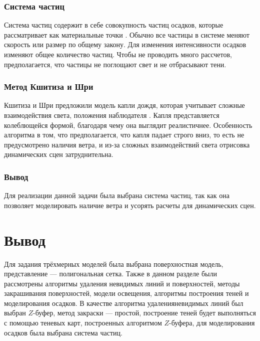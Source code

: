 \subsubsection{Система частиц}

Система частиц содержит в себе совокупность частиц осадков, которые рассматривает как материальные точки \cite{part_system}. Обычно все частицы в системе меняют скорость или размер по общему закону. Для изменения интенсивности осадков изменяют общее количество частиц. Чтобы не проводить много рассчетов, предполагается, что частицы не поглощают свет и не отбрасывают тени.

\subsubsection{Метод Кшитиза и Шри}
Кшитиза и Шри предложили модель капли дождя, которая
учитывает сложные взаимодействия света, положения наблюдателя \cite{shree}. Капля представляется колеблющейся формой, благодаря чему она выглядит реалистичнее. Особенность алгоритма в том, что предполагается, что капля падает строго вниз, то есть не предусмотрено наличия ветра, и из-за сложных взаимодействий света отрисовка динамических сцен затруднительна.

\subsubsection{Вывод} Для реализации данной задачи была выбрана система частиц, так как она позволяет моделировать наличие ветра и усорять расчеты для динамических сцен.

\section{Вывод} 
Для задания трёхмерных моделей была выбрана поверхностная модель, представление --- полигональная сетка. Также в данном разделе были рассмотрены алгоритмы удаления невидимых линий и поверхностей, методы закрашивания поверхностей, модели освещения, алгоритмы построения теней и моделирования осадков. В качестве алгоритма удаленияневидимых линий был выбран $Z$-буфер, метод закраски ---  простой, построение теней будет выполняться с помощью теневых карт, построенных алгоритмом $Z$-буфера, для моделирования осадков была выбрана система частиц.